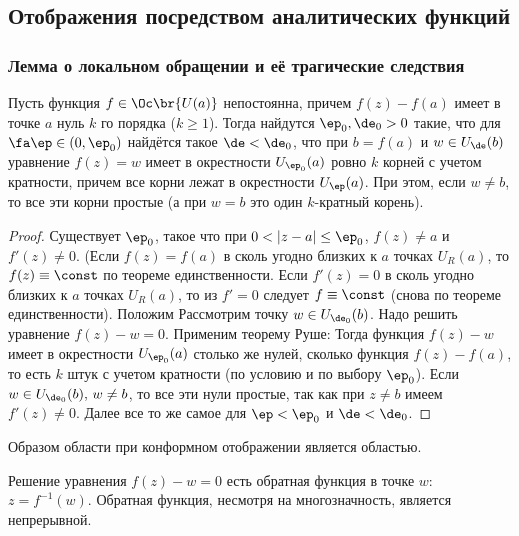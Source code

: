 \documentclass[a4paper]{article}
\begin{document}
\begin{theorem}
\subsection{Отображения посредством аналитических функций}

\subsubsection{Лемма о локальном обращении и её трагические следствия}

\begin{lemma}
Пусть функция $f\in \Oc\br{U(a)}$ непостоянна, причем $f(z)-f(a)$ имеет в точке $a$ нуль $k$ го порядка ($k \ge 1$).
Тогда найдутся $\ep_0, \de_0>0$ такие, что для $\fa \ep \in (0,\ep_0)$
найдётся такое $\de <\de_0$, что при $b = f(a)$ и $w \in U_\de(b)$  уравнение $f(z) = w$  имеет в окрестности $U_{\ep_0}(a)$  ровно $k$ корней с учетом кратности,
причем все корни лежат в окрестности $U_\ep(a)$. При этом, если $w\neq b$, то все эти корни простые
(а при $w=b$ это один $k$-кратный корень).
\end{lemma}
\begin{proof}
Существует $\ep_0$, такое что при $0<|z-a|\le\ep_0$, $f(z)\not=a$ и $f'(z)\not =0$.
(Если $f(z)=f(a)$  в сколь угодно близких к $a$  точках $U_R(a)$, то $f(z)\equiv \const$ по теореме единственности. Если $f'(z) = 0$  в сколь угодно близких к $a$ точках
$U_R(a)$, то из $f'=0$  следует $f\equiv \const$ (снова по теореме единственности).
Положим
Рассмотрим точку $w \in U_{\de_0}(b)$. Надо решить уравнение $f(z)-w=0$. Применим теорему Руше:
Тогда функция $f(z)-w$  имеет в окрестности $U_{\ep_0}(a)$ столько же нулей,   сколько функция $f(z)-f(a)$,
то есть $k$ штук с учетом кратности (по условию и по выбору $\ep_0$).
Если $w\in U_{\de_0}(b),\, w\neq b$, то все эти нули простые, так как при $z\neq b$ имеем $f'(z) \neq 0$.
Далее все то же самое для $\ep<\ep_0$ и $\de<\de_0$.
\end{proof}

\begin{imp}
Образом области при конформном отображении является областью.
\end{imp}

Решение уравнения $f(z)-w=0$ есть обратная функция в точке $w$: $z=f^{-1}(w)$.
Обратная функция,  несмотря на многозначность,  является непрерывной.


\end{theorem}
\end{document}
